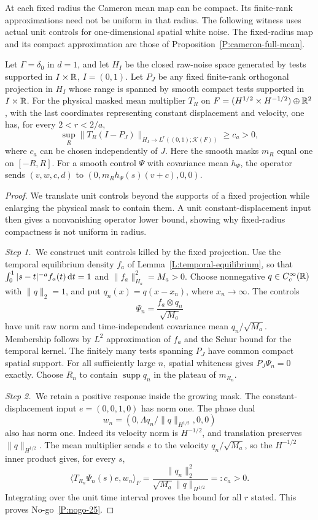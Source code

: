 At each fixed radius the Cameron mean map can be compact. Its finite-rank
approximations need not be uniform in that radius. The following witness uses
actual unit controls for one-dimensional spatial white noise. The fixed-radius
map and its compact approximation are those of
Proposition~\ref{P:cameron-full-mean}.

\setcounter{nogo}{24}
\begin{nogo}
  \label{P:nogo-25}
  Let $\Gamma=\delta_0$ in $d=1$, and let $H_I$ be the closed raw-noise
  space generated by tests supported in $I\times\mathbb{R}$, $I=(0,1)$. Let $P_J$
  be any fixed finite-rank orthogonal projection in $H_I$ whose range is
  spanned by smooth compact tests supported in $I\times\mathbb{R}$. For the physical masked mean multiplier $T_R$ on
  $F=(H^{1/2}\times H^{-1/2})\oplus\mathbb{R}^2$, with the last coordinates
  representing constant displacement and velocity, one has, for every
  $2<r<2/a$,
  \[
    \sup_R\|T_R(I-P_J)\|_{H_I\to L^r((0,1);\mathcal K(F))}\ge c_a>0,
  \]
  where $c_a$ can be chosen independently of $J$. Here the smooth masks $m_R$
  equal one on $[-R,R]$. For a smooth control $\Psi$ with covariance mean
  $h_\Psi$, the operator sends $(v,w,c,d)$ to
  $(0,m_Rh_\Psi(s)(v+c),0,0)$.
\end{nogo}
\begin{proof}
  We translate unit controls beyond the supports of a fixed projection while
  enlarging the physical mask to contain them. A unit constant-displacement
  input then gives a nonvanishing operator lower bound, showing why
  fixed-radius compactness is not uniform in radius.


  \medskip
  \noindent\textit{Step 1.~}We construct unit controls killed by the fixed
  projection.
  Use the temporal equilibrium density $f_a$ of
  Lemma~\ref{L:temporal-equilibrium}, so that
  $\int_0^1|s-t|^{-a}f_a(t)\,\mathrm{d} t=1$ and
  $\|f_a\|_{H_a}^2=M_a>0$.
  Choose nonnegative $q\in C_c^\infty(\mathbb{R})$ with $\|q\|_2=1$, and put
  $q_n(x)=q(x-x_n)$, where $x_n\to\infty$. The controls
  \[
    \Psi_n=\frac{f_a\otimes q_n}{\sqrt{M_a}}
  \]
  have unit raw norm and time-independent covariance mean
  $q_n/\sqrt{M_a}$. Membership follows by $L^2$ approximation of $f_a$ and
  the Schur bound for the temporal kernel.
  The finitely many tests spanning $P_J$ have common compact spatial support.
  For all sufficiently large $n$, spatial whiteness gives
  $P_J\Psi_n=0$ exactly. Choose $R_n$ to contain $\operatorname{supp}q_n$
  in the plateau of $m_{R_n}$.


  \medskip
  \noindent\textit{Step 2.~}We retain a positive response inside the growing
  mask.
  The constant-displacement input $e=(0,0,1,0)$ has norm one. The phase dual
  \[
    w_n=(0,\Lambda q_n/\|q\|_{H^{1/2}},0,0)
  \]
  also has norm one. Indeed its velocity norm is $H^{-1/2}$, and translation
  preserves $\|q\|_{H^{1/2}}$. The mean multiplier sends $e$ to the velocity
  $q_n/\sqrt{M_a}$, so the $H^{-1/2}$ inner product gives, for every $s$,
  \[
    \langle T_{R_n}\Psi_n(s)e,w_n\rangle_F
    =\frac{\|q_n\|_2^2}{\sqrt{M_a}\|q\|_{H^{1/2}}}
    =:c_a>0.
  \]
  Integrating over the unit time interval proves the bound for all $r$ stated.
  This proves No-go~\ref{P:nogo-25}.
\end{proof}

